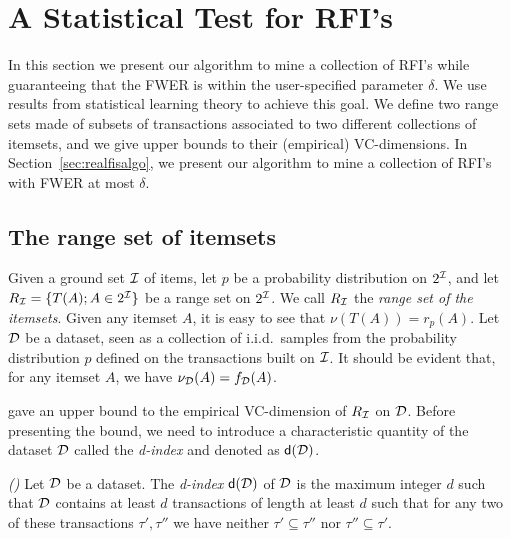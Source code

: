 \section{A Statistical Test for RFI's}\label{sec:main}
In this section we present our algorithm to mine a collection of RFI's
while guaranteeing that the FWER is within the user-specified parameter
$\delta$. We use results from statistical learning theory to achieve this goal.
We define two range sets made of subsets of transactions associated to two different
collections of itemsets, and we give upper bounds to their (empirical)
VC-dimensions. In Section~\ref{sec:realfisalgo}, we
present our algorithm to mine a collection of RFI's with FWER at most $\delta$.

\subsection{The range set of itemsets}\label{sec:rangeitemsets}
Given a ground set ${\cal I}$ of items, let $p$ be a probability distribution on $2^{\cal I}$,
and let $R_{\cal I}=\{T(A); A\in 2^{{\cal I}}\}$ be a range set
on $2^{\cal I}$. We call $R_{\cal I}$ the \emph{range set of the itemsets}. Given any
itemset $A$, it is easy to see that $\nu(T(A))=r_p(A)$. Let ${\cal D}$ be a dataset,
seen as a collection of i.i.d.~samples from the probability distribution $p$
defined on the transactions built on ${\cal I}$. It should be evident that, for any
itemset $A$, we have $\nu_{\cal D}(A)=f_{\cal D}(A)$.  

\iffalse
{\bf XXX:} In the reference for \citep{RiondatoU12} mention the extended revised
version from arXiv, from which the definition and the theorem below are taken
(but the numbers are the same from the PKDD one). We could just reference the
one from arXiv instead, but I prefer to reference the one from PKDD with the
additional specification, to give more ``weight.
\fi

\citet{RiondatoU12} gave an upper bound to the empirical VC-dimension of
$R_{\cal I}$ on ${\cal D}$. Before presenting the bound, we need to introduce a
characteristic quantity of the dataset ${\cal D}$ called the \emph{d-index} and
denoted as $\mathsf{d}({\cal D})$.
\begin{definition}\label{def:dindex}
  \emph{(\citep[Def.~12]{RiondatoU12})} Let ${\cal D}$ be a dataset. The
  \emph{d-index} $\mathsf{d}({\cal D})$ of ${\cal D}$ is the maximum integer $d$ such that
  ${\cal D}$ contains at least $d$ transactions of length at least $d$ such that for
  any two of these transactions $\tau',\tau''$ we have neither $\tau'\subseteq
  \tau''$ nor $\tau''\subseteq \tau'$.
\end{definition}

